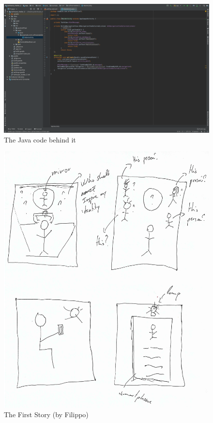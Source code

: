 \documentclass[12pt]{scrartcl}
\begin{document}
	\begin{figure}[H]
        		\centering
       		\includegraphics[width=\textwidth]{../images/androidStudio2.png}
       		\caption{The Java code behind it}
        		\label{androirdStudio2}
	\end{figure}
	
	\begin{figure}[H]
        		\centering
       		\includegraphics[width=\textwidth]{../images/story1.jpg}
       		\caption{The First Story (by Filippo)}
        		\label{story1}
	\end{figure}
	
\end{document}
